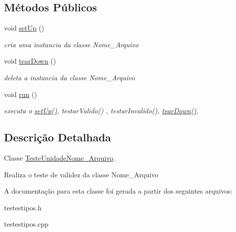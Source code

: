 \subsection*{\-Métodos \-Públicos}
\begin{DoxyCompactItemize}
\item 
\hypertarget{class_teste_unidade_nome___arquivo_a796f85778140f739fe2e6e8e1f87b731}{
void \hyperlink{class_teste_unidade_nome___arquivo_a796f85778140f739fe2e6e8e1f87b731}{set\-Up} ()}
\label{class_teste_unidade_nome___arquivo_a796f85778140f739fe2e6e8e1f87b731}

\begin{DoxyCompactList}\small\item\em cria uma instancia da classe \-Nome\-\_\-\-Arquivo \end{DoxyCompactList}\item 
\hypertarget{class_teste_unidade_nome___arquivo_a2626213ef3c457d3956c058d522cf34a}{
void \hyperlink{class_teste_unidade_nome___arquivo_a2626213ef3c457d3956c058d522cf34a}{tear\-Down} ()}
\label{class_teste_unidade_nome___arquivo_a2626213ef3c457d3956c058d522cf34a}

\begin{DoxyCompactList}\small\item\em deleta a instancia da classe \-Nome\-\_\-\-Arquivo \end{DoxyCompactList}\item 
\hypertarget{class_teste_unidade_nome___arquivo_a4e6ee79dcbde8c2b2ff5ca6b6a990335}{
void \hyperlink{class_teste_unidade_nome___arquivo_a4e6ee79dcbde8c2b2ff5ca6b6a990335}{run} ()}
\label{class_teste_unidade_nome___arquivo_a4e6ee79dcbde8c2b2ff5ca6b6a990335}

\begin{DoxyCompactList}\small\item\em executa o \hyperlink{class_teste_unidade_nome___arquivo_a796f85778140f739fe2e6e8e1f87b731}{set\-Up()}, testar\-Valido() , testar\-Invalido(), \hyperlink{class_teste_unidade_nome___arquivo_a2626213ef3c457d3956c058d522cf34a}{tear\-Down()}. \end{DoxyCompactList}\end{DoxyCompactItemize}


\subsection{\-Descrição \-Detalhada}
\-Classe \hyperlink{class_teste_unidade_nome___arquivo}{\-Teste\-Unidade\-Nome\-\_\-\-Arquivo}. 

\-Realiza o teste de validez da classe \-Nome\-\_\-\-Arquivo 

\-A documentação para esta classe foi gerada a partir dos seguintes arquivos\-:\begin{DoxyCompactItemize}
\item 
testestipos.\-h\item 
testestipos.\-cpp\end{DoxyCompactItemize}
